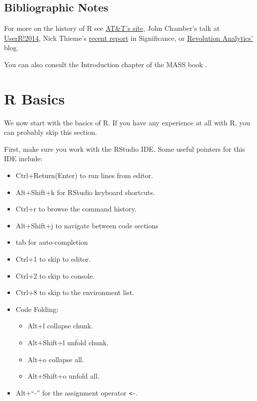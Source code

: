 \documentclass[]{book}
\providecommand{\tightlist}{%
  \setlength{\itemsep}{0pt}\setlength{\parskip}{0pt}}
\theoremstyle{definition}
\theoremstyle{definition}
\theoremstyle{definition}
\theoremstyle{remark}
\begin{document}
\section{Bibliographic Notes}\label{bibliographic-notes}

For more on the history of R see
\href{http://www.research.att.com/articles/featured_stories/2013_09/201309_SandR.html?fbid=Yxy4qyQzmMa}{AT\&T's
site}, John Chamber's talk at
\href{https://www.youtube.com/watch?v=_hcpuRB5nGs}{UserR!2014}, Nick
Thieme's
\href{https://rss.onlinelibrary.wiley.com/doi/10.1111/j.1740-9713.2018.01169.x}{recent
report} in Significance, or
\href{https://blog.revolutionanalytics.com/2017/10/updated-history-of-r.html}{Revolution
Analytics'} blog.

You can also consult the Introduction chapter of the MASS book
\citep{venables2013modern}.

\chapter{R Basics}\label{basics}

We now start with the basics of R. If you have any experience at all
with R, you can probably skip this section.

First, make sure you work with the RStudio IDE. Some useful pointers for
this IDE include:

\begin{itemize}
\tightlist
\item
  Ctrl+Return(Enter) to run lines from editor.
\item
  Alt+Shift+k for RStudio keyboard shortcuts.
\item
  Ctrl+r to browse the command history.
\item
  Alt+Shift+j to navigate between code sections
\item
  tab for auto-completion
\item
  Ctrl+1 to skip to editor.
\item
  Ctrl+2 to skip to console.
\item
  Ctrl+8 to skip to the environment list.
\item
  Code Folding:

  \begin{itemize}
  \tightlist
  \item
    Alt+l collapse chunk.
  \item
    Alt+Shift+l unfold chunk.
  \item
    Alt+o collapse all.
  \item
    Alt+Shift+o unfold all.
  \end{itemize}
\item
  Alt+``-'' for the assignment operator \texttt{\textless{}-}.
\end{itemize}
\end{document}
